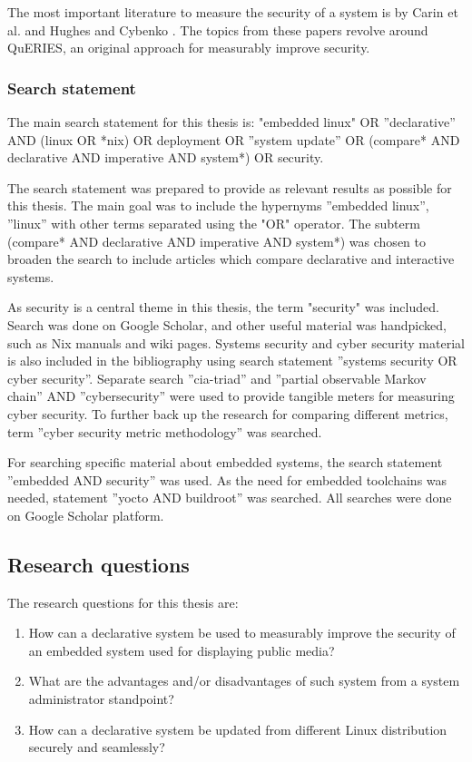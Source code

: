 The most important literature to measure the security of a system is
by Carin et al. and Hughes and Cybenko \cite{carin2008cybersecurity,
  hughes2013quantitative}. The topics from these papers revolve around
QuERIES, an original approach for measurably improve security. 

\subsubsection{Search statement} \label{searchstatement}

The main search statement for this thesis is: "embedded linux" OR
''declarative'' AND (linux OR *nix) OR deployment OR ''system update''
OR (compare* AND declarative AND imperative AND system*) OR security.

The search statement was prepared to provide as relevant results as
possible for this thesis. The main goal was to include the hypernyms
''embedded linux'', ''linux'' with other terms separated using the
"OR" operator. The subterm (compare* AND declarative AND imperative
AND system*) was chosen to broaden the search to include articles
which compare declarative and interactive systems.

As security is a central theme in this thesis, the term "security" was
included. Search was done on Google Scholar, and other useful material
was handpicked, such as Nix manuals and wiki pages. Systems security
and cyber security material is also included in the bibliography using
search statement ''systems security OR cyber security''. Separate search
''cia-triad'' and ''partial observable Markov chain'' AND
''cybersecurity'' were used to provide tangible meters for measuring
cyber security. To further back up the research for comparing
different metrics, term ''cyber security metric methodology'' was
searched.

For searching specific material about embedded systems, the search
statement ''embedded AND security'' was used. As the need for embedded
toolchains was needed, statement ''yocto AND buildroot'' was
searched. All searches were done on Google Scholar platform.

\subsection{Research questions} \label{resquest}

The research questions for this thesis are:

\begin{enumerate}
\item How can a declarative system be used to measurably improve the
  security of an embedded system used for displaying public media?
\item What are the advantages and/or disadvantages of such system from
  a system administrator standpoint?
\item How can a declarative system be updated from different Linux
  distribution securely and seamlessly?
\end{enumerate}

